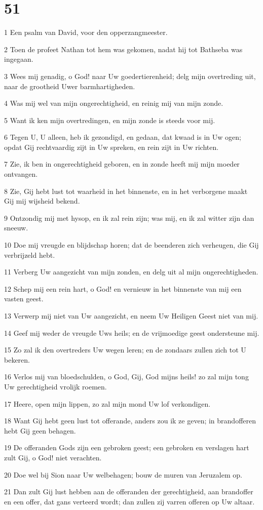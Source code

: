 \chapter{51}

\par 1 Een psalm van David, voor den opperzangmeester.
\par 2 Toen de profeet Nathan tot hem was gekomen, nadat hij tot Bathseba was ingegaan.
\par 3 Wees mij genadig, o God! naar Uw goedertierenheid; delg mijn overtreding uit, naar de grootheid Uwer barmhartigheden.
\par 4 Was mij wel van mijn ongerechtigheid, en reinig mij van mijn zonde.
\par 5 Want ik ken mijn overtredingen, en mijn zonde is steeds voor mij.
\par 6 Tegen U, U alleen, heb ik gezondigd, en gedaan, dat kwaad is in Uw ogen; opdat Gij rechtvaardig zijt in Uw spreken, en rein zijt in Uw richten.
\par 7 Zie, ik ben in ongerechtigheid geboren, en in zonde heeft mij mijn moeder ontvangen.
\par 8 Zie, Gij hebt lust tot waarheid in het binnenste, en in het verborgene maakt Gij mij wijsheid bekend.
\par 9 Ontzondig mij met hysop, en ik zal rein zijn; was mij, en ik zal witter zijn dan sneeuw.
\par 10 Doe mij vreugde en blijdschap horen; dat de beenderen zich verheugen, die Gij verbrijzeld hebt.
\par 11 Verberg Uw aangezicht van mijn zonden, en delg uit al mijn ongerechtigheden.
\par 12 Schep mij een rein hart, o God! en vernieuw in het binnenste van mij een vasten geest.
\par 13 Verwerp mij niet van Uw aangezicht, en neem Uw Heiligen Geest niet van mij.
\par 14 Geef mij weder de vreugde Uws heils; en de vrijmoedige geest ondersteune mij.
\par 15 Zo zal ik den overtreders Uw wegen leren; en de zondaars zullen zich tot U bekeren.
\par 16 Verlos mij van bloedschulden, o God, Gij, God mijns heils! zo zal mijn tong Uw gerechtigheid vrolijk roemen.
\par 17 Heere, open mijn lippen, zo zal mijn mond Uw lof verkondigen.
\par 18 Want Gij hebt geen lust tot offerande, anders zou ik ze geven; in brandofferen hebt Gij geen behagen.
\par 19 De offeranden Gods zijn een gebroken geest; een gebroken en verslagen hart zult Gij, o God! niet verachten.
\par 20 Doe wel bij Sion naar Uw welbehagen; bouw de muren van Jeruzalem op.
\par 21 Dan zult Gij lust hebben aan de offeranden der gerechtigheid, aan brandoffer en een offer, dat gans verteerd wordt; dan zullen zij varren offeren op Uw altaar.

